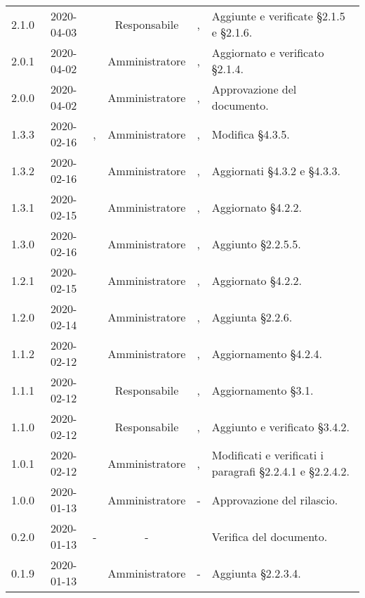 {\begin{longtable}{ c c  C{2.3cm} c C{3cm} C{3.2cm}}
2.1.0 & 2020-04-03 & \LD{} & Responsabile &  \AT{}, \PF{} & Aggiunte e verificate §2.1.5 e §2.1.6.  \\

2.0.1 & 2020-04-02 & \SE{} & Amministratore &  \AT{}, \PF{} & Aggiornato e verificato §2.1.4.  \\

2.0.0 & 2020-04-02 & \LD{} & Amministratore & \CE{}, \MC{} & Approvazione del documento. \\

1.3.3 & 2020-02-16 & \DF{}, \PF{} & Amministratore & \CE{}, \MC{} & Modifica §4.3.5. \\

1.3.2 & 2020-02-16 & \SE{} & Amministratore & \CE{}, \MC{} & Aggiornati §4.3.2 e §4.3.3. \\

1.3.1 & 2020-02-15 & \SE{} & Amministratore & \CE{}, \MC{} & Aggiornato §4.2.2. \\

1.3.0 & 2020-02-16 & \SE{} & Amministratore & \CE{}, \MC{} & Aggiunto §2.2.5.5. \\

1.2.1 & 2020-02-15 & \SE{} & Amministratore & \CE{}, \MC{} & Aggiornato §4.2.2. \\

1.2.0 & 2020-02-14 & \SE{} & Amministratore & \CE{}, \MC{} & Aggiunta §2.2.6. \\

1.1.2 & 2020-02-12 & \SE{} & Amministratore & \CE{}, \MC{} & Aggiornamento §4.2.4. \\ 

1.1.1 & 2020-02-12 & \BR{} & Responsabile & \CE{}, \MC{} & Aggiornamento §3.1. \\ 

1.1.0 & 2020-02-12 & \BR{} & Responsabile & \CE{}, \MC{} & Aggiunto e verificato §3.4.2. \\

1.0.1 & 2020-02-12 & \SE{} & Amministratore & \CE{}, \MC{} & Modificati e verificati i paragrafi §2.2.4.1 e §2.2.4.2. \\ 

1.0.0 & 2020-01-13 & \AT{} & Amministratore & - & Approvazione del  rilascio.  \\

0.2.0 & 2020-01-13 & - & - & \PF{} & Verifica del documento.  \\ 

0.1.9 & 2020-01-13 & \CE{} & Amministratore & - & Aggiunta §2.2.3.4. \\


\end{longtable}}
